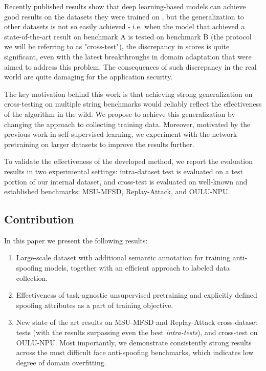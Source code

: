 \documentclass[10pt,twocolumn,letterpaper]{article}
\begin{document}
Recently published results show that deep learning-based models can achieve good results on the datasets they were trained on \cite{CDCNN}\cite{CNN-LSTM}\cite{3d-synth}, but the generalization to other datasets is not so easily achieved - i.e. when the model that achieved a state-of-the-art result on benchmark A is tested on benchmark B (the protocol we will be referring to as "cross-test"), the discrepancy in scores is quite significant, even with the latest breakthroughs in domain adaptation that were aimed to address this problem. The consequences of such discrepancy in the real world are quite damaging for the application security.

The key motivation behind this work is that achieving strong generalization on cross-testing on multiple string benchmarks would reliably reflect the effectiveness of the algorithm in the wild. We propose to achieve this generalization by changing the approach to collecting training data. Moreover, motivated by the previous work in self-supervised learning\cite{big-self-supervised}\cite{SEER}, we experiment with the network pretraining on larger datasets to improve the results further.

To validate the effectiveness of the developed method, we report the evaluation results in two experimental settings: intra-dataset test is evaluated on a test portion of our internal dataset, and cross-test is evaluated on well-known and established benchmarks: MSU-MFSD\cite{MFSD}, Replay-Attack\cite{mci/Chingovska2012}, and OULU-NPU\cite{OULU_NPU_2017}.



\subsection{Contribution}
In this paper we present the following results:

\begin{enumerate}
    \item Large-scale dataset with additional semantic annotation for training anti-spoofing models, together with an efficient approach to labeled data collection.
    \item Effectiveness of task-agnostic unsupervised pretraining and explicitly defined spoofing attributes as a part of training objective.
    \item New state of the art results on MSU-MFSD\cite{MFSD} and Replay-Attack\cite{mci/Chingovska2012} cross-dataset tests (with the results surpassing even the best \textit{intra-tests}), and cross-test on OULU-NPU\cite{OULU_NPU_2017}. Most importantly, we demonstrate consistently strong results across the most difficult face anti-spoofing benchmarks, which indicates low degree of domain overfitting.
\end{enumerate}
\end{document}
